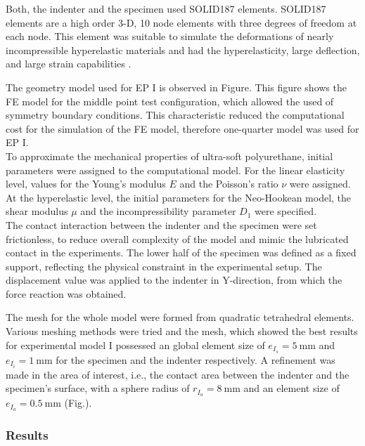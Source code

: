 Both, the indenter and the specimen used SOLID187 elements. SOLID187 elements are a high order 3-D, 10 node elements with three degrees of freedom at each node. 
This element was suitable to simulate the deformations of nearly incompressible hyperelastic materials 
and had the hyperelasticity, large deflection, and large strain capabilities \cite{Ansys2010}.

The geometry model used for EP I is observed in Figure. %
This figure shows the FE model for the middle point test configuration, which allowed the used 
of symmetry boundary conditions. This characteristic reduced the computational cost for the simulation 
of the FE model, therefore one-quarter model was used for EP I.\\

To approximate the mechanical properties of ultra-soft polyurethane, initial parameters were assigned 
to the computational model. For the linear elasticity level, values for the Young's modulus $E$ and the 
Poisson's ratio $\nu$ were assigned. At the hyperelastic level, the initial parameters for the Neo-Hookean model, 
the shear modulus $\mu$ and the incompressibility parameter $D_1$ were specified.\\ 

The contact interaction between the indenter and the specimen were set frictionless, to reduce 
overall complexity of the model and mimic the lubricated contact in the experiments.
The lower half of the specimen was defined as a fixed support, reflecting the physical constraint in the 
experimental setup. The displacement value was applied to the indenter in Y-direction, 
from which the force reaction was obtained.

The mesh for the whole model were formed from quadratic tetrahedral elements. 
Various meshing methods were tried and the mesh, which showed the best results for experimental model I 
possessed an global element size of $e_{I_s}=\SI{5}{\milli\meter}$ and $e_{I_i}=\SI{1}{\milli\meter}$ for the specimen 
and the indenter respectively. A refinement was made in the area of interest, i.e., the contact 
area between the indenter and the specimen's surface, with a sphere radius of 
$r_{I_a}=\SI{8}{\milli\meter}$ and an element size of $e_{I_a}=\SI{0.5}{\milli\meter}$ (Fig.). %

\subsubsection*{Results}


